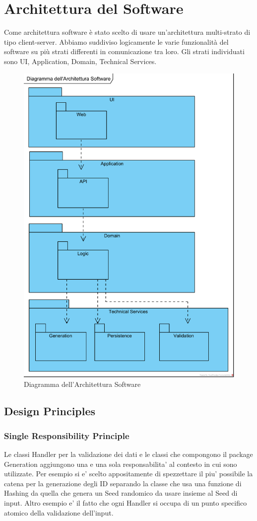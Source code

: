\documentclass[a4paper,12pt]{report}
\begin{document}
         \section{Architettura del Software}
Come architettura software è stato scelto di usare un'architettura multi-strato di tipo client-server. Abbiamo suddiviso logicamente le varie funzionalità del software su più strati differenti in comunicazione tra loro. Gli strati individuati sono UI, Application, Domain, Technical Services.
		\begin{figure}[!h]
			\centering
			\includegraphics[width=0.5\linewidth]{image/Diagramma-dell'Architettura-Software.png}
			\caption{Diagramma dell'Architettura Software}\label{fig:Diagramma-dell'Architettura-Software.}
		\end{figure}         
\newpage
		\subsection{Design Principles}
			\subsubsection{Single Responsibility Principle}
Le classi Handler per la validazione dei dati e le classi che compongono il package Generation aggiungono una e una sola responsabilita' al contesto in cui sono utilizzate.
Per esempio si e' scelto appositamente di spezzettare il piu' possibile la catena per la generazione degli ID separando la classe che usa una funzione di Hashing da quella che genera un Seed randomico da usare insieme al Seed di input.
Altro esempio e' il fatto che ogni Handler si occupa di un punto specifico atomico della validazione dell'input.
\end{document}

